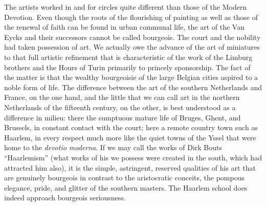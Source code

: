 The artists worked in and for circles quite different than those of the
Modern Devotion. Even though the roots of the flourishing of painting as
well as those of the renewal of faith can be found in urban communal
life, the art of the Van Eycks and their successors cannot be called
bourgeois. The court and the nobility had taken possession of art. We
actually owe the advance of the art of miniatures to that full artistic
refinement that is characteristic of the work of the Limburg brothers
and the Hours of Turin primarily to princely sponsorship. The fact of
the matter is that the wealthy bourgeoisie of the large Belgian cities
aspired to a noble form of life. The difference between the art of the
southern Netherlands and France, on the one hand, and the little that we
can call art in the northern Netherlands of the fifteenth century, on
the other, is best understood as a difference in milieu: there the
sumptuous mature life of Bruges, Ghent, and Brussels, in constant
contact with the court; here a remote country town such as Haarlem, in
every respect much more like the quiet towns of the Yssel that were home
to the \emph{devotio moderna}. If we may call the works of Dirk Bouts
``Haarlemism'' (what works of his we possess were created in
\protect\hypertarget{20_ILLUSTRATIONS_FOLLOW_PAGE.xhtmlux5cux23page_316}{}{}the
south, which had attracted him also), it is the simple, astringent,
reserved qualities of his art that are genuinely bourgeois in contrast
to the aristocratic conceits, the pompous elegance, pride, and glitter
of the southern masters. The Haarlem school does indeed approach
bourgeois seriousness.

